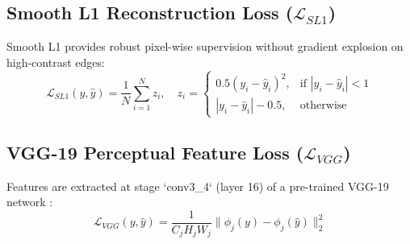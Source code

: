 \documentclass[10pt,twocolumn,letterpaper]{article}
\begin{document}
\begin{table}[h]
\centering
\small
\caption{\textbf{Composite Loss Function Components and Hyper-parameters.}}
\label{tab:loss_weights}
\end{table}

\subsection{Smooth L1 Reconstruction Loss ($\mathcal{L}_{SL1}$)}
Smooth L1 provides robust pixel-wise supervision without gradient explosion on high-contrast edges:
\begin{equation}
\mathcal{L}_{SL1}(y, \hat{y}) = \frac{1}{N} \sum_{i=1}^N z_i, \quad z_i = \begin{cases} 0.5 (y_i - \hat{y}_i)^2, & \text{if } |y_i - \hat{y}_i| < 1 \\ |y_i - \hat{y}_i| - 0.5, & \text{otherwise} \end{cases}
\end{equation}

\subsection{VGG-19 Perceptual Feature Loss ($\mathcal{L}_{VGG}$)}
Features are extracted at stage `conv3\_4` (layer 16) of a pre-trained VGG-19 network \cite{johnson2016perceptual}:
\begin{equation}
\mathcal{L}_{VGG}(y, \hat{y}) = \frac{1}{C_j H_j W_j} \|\phi_j(y) - \phi_j(\hat{y})\|_2^2
\end{equation}
\end{document}
